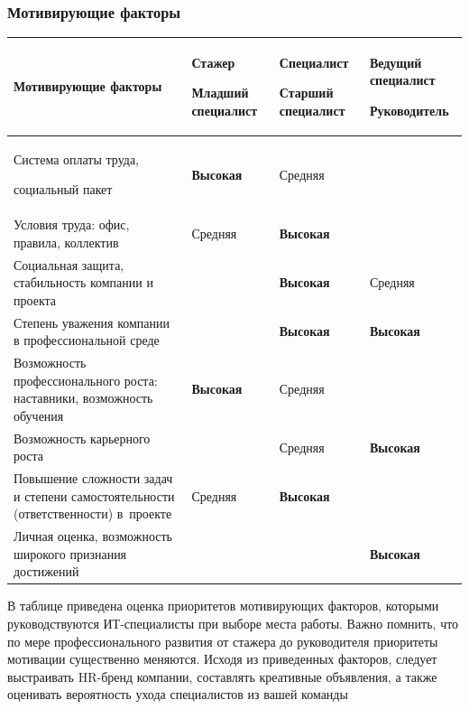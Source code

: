 \documentclass{../industrial-development}
\begin{document}
\begin{frame} \frametitle{Мотивирующие факторы}
	\begin{table}[h]
	\begin{center}
\begin{tabular}{|p{4cm}|p{}|p{2cm}|p{2cm}|}
\hline
\tiny \textbf{Мотивирующие факторы} & \tiny \textbf{Стажер} 

\tiny \textbf{Младший специалист} & \tiny \textbf{Специалист} 

\tiny \textbf{Старший специалист} & \tiny \textbf{Ведущий специалист} 

\tiny \textbf{Руководитель} \\
\hline
\tiny Система оплаты труда, 

социальный пакет & \tiny \textbf{Высокая} & \tiny Средняя & \tiny \\
\hline
\tiny Условия труда: офис, правила, коллектив & \tiny Средняя & \tiny \textbf{Высокая} & \\
\hline
\tiny Социальная защита, стабильность компании и проекта &  & \tiny \textbf{Высокая}  & \tiny Средняя \\
\hline
 \tiny Степень уважения компании в профессиональной среде &  & \tiny \textbf{Высокая} & \tiny \textbf{Высокая} \\
\hline
\tiny Возможность профессионального роста: наставники, возможность обучения  & \tiny \textbf{Высокая} & \tiny Средняя & \\ 
\hline
\tiny Возможность карьерного роста & & \tiny Средняя & \tiny \textbf{Высокая} \\
\hline
\tiny Повышение сложности задач и степени самостоятельности (ответственности) в~проекте & \tiny Средняя & \tiny\textbf{Высокая} & \\
\hline
\tiny Личная оценка, возможность широкого признания достижений & & & \tiny \textbf{Высокая} \\

\hline
\end{tabular}
\end{center}
\end{table}
\end{frame}

\lecturenotes

В таблице приведена оценка приоритетов мотивирующих факторов, которыми руководствуются ИТ-специалисты при выборе места работы. Важно помнить, что по мере профессионального развития от стажера до руководителя приоритеты мотивации существенно меняются.
Исходя из приведенных факторов, следует выстраивать HR-бренд компании, составлять креативные объявления, а также оценивать вероятность ухода специалистов из вашей команды~\cite[с.~277]{Pererva}
\end{document}
